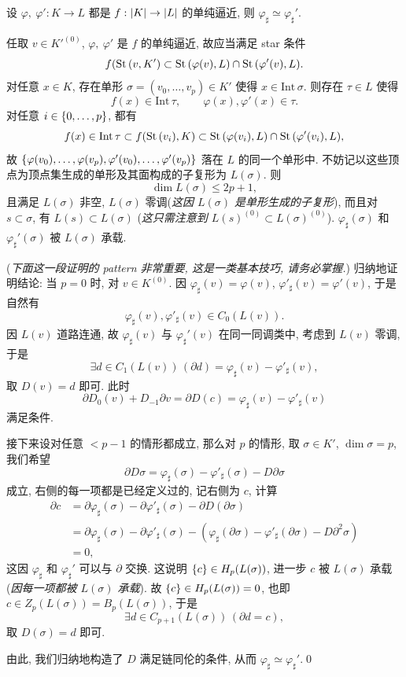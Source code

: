 \begin{Theorem}\label{thm:单纯逼近链同伦}
	设 $ \varphi,\ \varphi' : K\to L $ 都是 $ f : \left| K \right| \to\left| L \right|  $ 的单纯逼近, 则 $ \varphi_\sharp\simeq\varphi_\sharp' $.
\end{Theorem}
\begin{Proof}
	任取 $ v\in K'^{(0)} $, $ \varphi,\ \varphi' $ 是 $ f $ 的单纯逼近, 故应当满足 star 条件
	\[
		f(\mathrm{St}\,(v,K')\subset\mathrm{St}\,(\varphi(v),L)\cap\mathrm{St}\,(\varphi'(v),L).
	\]
	对任意 $ x\in K $, 存在单形 $ \sigma=(v_0,\dots,v_p)\in K' $ 使得 $ x\in\mathrm{Int}\,\sigma $. 则存在 $ \tau\in L $ 使得
	\[
		f(x)\in\mathrm{Int}\,\tau,\qquad \varphi(x),\varphi'(x)\in\tau.
	\]
	对任意 $ i\in\left\{ 0,\dots,p \right\} $, 都有
	\[
		f(x)\in\mathrm{Int}\,\tau\subset f(\mathrm{St}\,(v_i),K)\subset\mathrm{St}\,(\varphi(v_i),L)\cap\mathrm{St}\,(\varphi'(v_i),L),
	\]
	故 $ \left\{ \varphi(v_0),\dots,\varphi(v_p),\varphi'(v_0),\dots,\varphi'(v_p) \right\} $ 落在 $ L $ 的同一个单形中. 不妨记以这些顶点为顶点集生成的单形及其面构成的子复形为 $ L(\sigma) $. 则
	\[
		\dim L(\sigma)\leqslant 2p+1,
	\]
	且满足 $ L(\sigma) $ 非空, $ L(\sigma) $ 零调(\textit{这因 $ L(\sigma) $ 是单形生成的子复形}), 而且对 $ s\subset\sigma $, 有 $ L(s)\subset L(\sigma) $ (\textit{这只需注意到 $ L(s)^{(0)}\subset L(\sigma)^{(0)} $}). $ \varphi_\sharp(\sigma) $ 和 $ \varphi_\sharp'(\sigma) $ 被 $ L(\sigma) $ 承载.

	(\textit{下面这一段证明的 pattern 非常重要, 这是一类基本技巧, 请务必掌握.}) 归纳地证明结论: 当 $ p=0 $ 时, 对 $ v\in K^{(0)} $. 因 $ \varphi_\sharp(v)=\varphi(v) $, $ \varphi'_\sharp(v)=\varphi'(v) $, 于是自然有
	\[
		\varphi_\sharp(v),\varphi'_\sharp(v)\in C_0(L(v)).
	\]
	因 $ L(v) $ 道路连通, 故 $ \varphi_\sharp(v) $ 与 $ \varphi_\sharp'(v) $ 在同一同调类中, 考虑到 $ L(v) $ 零调, 于是
	\[
		\exists d\in C_1(L(v))\,(\partial d)=\varphi_\sharp(v)-\varphi'_\sharp(v),
	\]
	取 $ D(v)=d $ 即可. 此时
	\[
		\partial D_0(v)+D_{-1}\partial v=\partial D(c)=\varphi_{\sharp}(v)-\varphi'_\sharp(v)
	\]
	满足条件.

	接下来设对任意 $ <p-1 $ 的情形都成立, 那么对 $ p $ 的情形, 取 $ \sigma\in K' $, $ \dim\sigma=p $, 我们希望
	\[
		\partial D\sigma=\varphi_\sharp(\sigma)-\varphi'_\sharp(\sigma)-D\partial\sigma
	\]
	成立, 右侧的每一项都是已经定义过的, 记右侧为 $ c $, 计算
	\[
		\begin{aligned}
			\partial c&=\partial\varphi_\sharp(\sigma)-\partial\varphi'_\sharp(\sigma)-\partial D(\partial\sigma)\\
			&=\partial\varphi_\sharp(\sigma)-\partial\varphi'_\sharp(\sigma)-(\varphi_\sharp(\partial\sigma)-\varphi'_\sharp(\partial\sigma)-D\partial^2\sigma)\\
			&=0,
		\end{aligned}
	\]
	这因 $ \varphi_\sharp $ 和 $ \varphi_\sharp' $ 可以与 $ \partial $ 交换. 这说明 $ \left\{ c \right\}\in H_p(L(\sigma)) $, 进一步 $ c $ 被 $ L(\sigma) $ 承载(\textit{因每一项都被 $ L(\sigma) $ 承载}). 故 $ \left\{ c \right\}\in H_p(L(\sigma))=0 $, 也即 $ c\in Z_p(L(\sigma))=B_p(L(\sigma)) $, 于是
	\[
		\exists d\in C_{p+1}(L(\sigma))\,(\partial d=c),
	\]
	取 $ D(\sigma)=d $ 即可.

	由此, 我们归纳地构造了 $ D $ 满足链同伦的条件, 从而 $ \varphi_\sharp\simeq\varphi_\sharp' $.\qed
\end{Proof}

